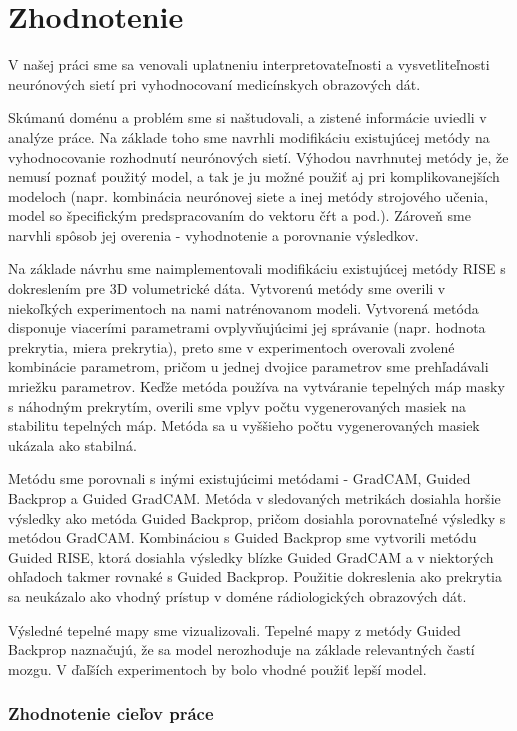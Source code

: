 \chapter{Zhodnotenie}

V našej práci sme sa venovali uplatneniu interpretovateľnosti a vysvetliteľnosti neurónových sietí pri vyhodnocovaní medicínskych obrazových dát. 

Skúmanú doménu a problém sme si naštudovali, a zistené informácie uviedli v analýze práce. Na základe toho sme navrhli modifikáciu existujúcej metódy na vyhodnocovanie rozhodnutí neurónových sietí. Výhodou navrhnutej metódy je, že nemusí poznať použitý model, a tak je ju možné použiť aj pri komplikovanejších modeloch (napr. kombinácia neurónovej siete a inej metódy strojového učenia, model so špecifickým predspracovaním do vektoru čŕt a pod.). Zároveň sme narvhli spôsob jej overenia - vyhodnotenie a porovnanie výsledkov.

Na základe návrhu sme naimplementovali modifikáciu existujúcej metódy RISE s dokreslením pre 3D volumetrické dáta. Vytvorenú metódy sme overili v niekoľkých experimentoch na nami natrénovanom modeli. Vytvorená metóda disponuje viacerími parametrami ovplyvňujúcimi jej správanie (napr. hodnota prekrytia, miera prekrytia), preto sme v experimentoch overovali zvolené kombinácie parametrom, pričom u jednej dvojice parametrov sme prehľadávali mriežku parametrov. Keďže metóda používa na vytváranie tepelných máp masky s náhodným prekrytím, overili sme vplyv počtu vygenerovaných masiek na stabilitu tepelných máp. Metóda sa u vyššieho počtu vygenerovaných masiek ukázala ako stabilná.

Metódu sme porovnali s inými existujúcimi metódami - GradCAM, Guided Backprop a Guided GradCAM. Metóda v sledovaných metrikách dosiahla horšie výsledky ako metóda Guided Backprop, pričom dosiahla porovnateľné výsledky s metódou GradCAM. Kombináciou s Guided Backprop sme vytvorili metódu Guided RISE, ktorá dosiahla výsledky blízke Guided GradCAM a v niektorých ohľadoch takmer rovnaké s Guided Backprop. Použitie dokreslenia ako prekrytia sa neukázalo ako vhodný prístup v doméne rádiologických obrazových dát. 

Výsledné tepelné mapy sme vizualizovali. Tepelné mapy z metódy Guided Backprop naznačujú, že sa model nerozhoduje na základe relevantných častí mozgu. V ďaľších experimentoch by bolo vhodné použiť lepší model.

\subsection{Zhodnotenie cieľov práce}

